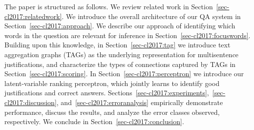 The paper is structured as follows. We review related work in Section~\ref{sec-cl2017:relatedwork}. 
We introduce the overall architecture of our QA system in Section~\ref{sec-cl2017:approach}. We describe our approach of identifying which words in the question are relevant for inference in Section~\ref{sec-cl2017:focuswords}. Building upon this knowledge, in Section~\ref{sec-cl2017:tag} we introduce text aggregation graphs (TAGs) as the underlying representation for multisentence justifications, and characterize the types of connections captured by TAGs in Section~\ref{sec-cl2017:scoring}. 
 In Section~\ref{sec-cl2017:perceptron} we introduce our latent-variable ranking perceptron, which jointly learns to identify good justifications and correct answers. Sections~\ref{sec-cl2017:experiments},~\ref{sec-cl2017:discussion}, and~\ref{sec-cl2017:erroranalysis} empirically demonstrate performance, discuss the results, and analyze the error classes observed, respectively. We conclude in Section~\ref{sec-cl2017:conclusion}. 

